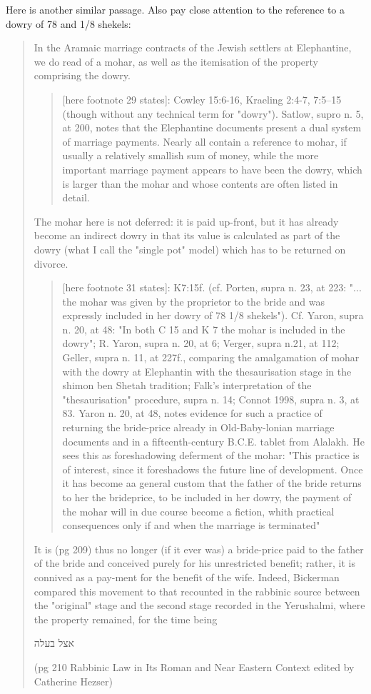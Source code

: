\documentclass[11pt]{article}
\begin{document}
Here is another similar passage. Also pay close attention to the reference to a dowry of 78 and 1/8 shekels:
\begin{quote}
In the Aramaic marriage contracts of the Jewish settlers at Elephantine, we do read of a mohar, as well as the itemisation of the property comprising the dowry.
\begin{quote}
[here footnote 29 states]:
Cowley 15:6-16, Kraeling 2:4-7, 7:5--15 (though without any technical term for "dowry").
Satlow, supro n. 5, at 200, notes that the Elephantine documents present a dual system of marriage payments. Nearly all contain a reference to mohar, if usually a relatively smallish sum of money, while the more important marriage payment appears to have been the dowry, which is larger than the mohar and whose contents are often listed in detail. 
\end{quote}

The mohar here is not deferred: it is paid up-front, but it has already become an indirect dowry in that its value is calculated as part of the dowry (what I call the "single pot" model) which has to be returned on divorce.
 \begin{quote}
 [here footnote 31 states]:
 K7:15f. (cf. Porten, supra n. 23, at 223: "... the mohar was given by the proprietor to the bride and was expressly included in her dowry of 78 1/8 shekels"). Cf. Yaron, supra n. 20, at 48: "In both C 15 and K 7 the mohar is included in the dowry"; R. Yaron, supra n. 20, at 6; Verger, supra n.21, at 112; Geller, supra n. 11, at 227f., comparing the amalgamation of mohar with the dowry at Elephantin with the thesaurisation stage in the shimon ben Shetah tradition; Falk's interpretation of the "thesaurisation" procedure, supra n. 14; Connot 1998, supra n. 3, at 83. Yaron n. 20, at 48, notes evidence for such a practice of returning the bride-price already in Old-Baby-lonian marriage documents and in a fifteenth-century B.C.E. tablet from Alalakh. He sees this as foreshadowing deferment of the mohar: "This practice is of interest, since it foreshadows the future line of development. Once it has become aa general custom that the father of the bride returns to her the brideprice, to be included in her dowry, the payment of the mohar will in due course become a fiction, whith practical consequences only if and when the marriage is terminated"

\end{quote}
It is (pg 209) thus no longer (if it ever was) a bride-price paid to the father of the bride and conceived purely for his unrestricted benefit; rather, it is connived as a pay-ment for the benefit of the wife. Indeed, Bickerman compared this movement to that recounted in the rabbinic source between the "original" stage and the second stage recorded in the Yerushalmi, where the property remained, for the time being \begin{hebrew}אצל בעלה\end{hebrew} (pg 210 Rabbinic Law in Its Roman and Near Eastern Context edited by Catherine Hezser)
\end{quote}
\end{document}
